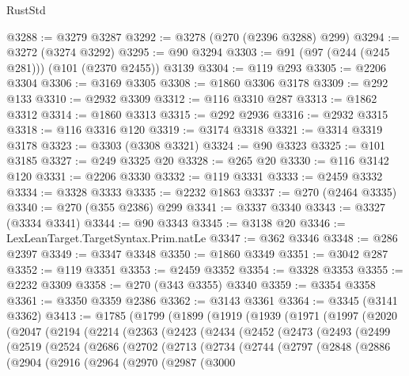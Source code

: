 \begin{lexlean}{RustStd}
\begin{coremodule}
@3288 := @3279 @3287
@3292 := @3278 (@270 (@2396 @3288) @299)
@3294 := @3272 (@3274 @3292)
@3295 := @90 @3294
@3303 := @91 (@97 (@244 (@245 @281))) (@101 (@2370 @2455)) @3139
@3304 := @119 @293
@3305 := @2206 @3304
@3306 := @3169 @3305
@3308 := @1860 @3306 @3178
@3309 := @292 @133
@3310 := @2932 @3309
@3312 := @116 @3310 @287
@3313 := @1862 @3312
@3314 := @1860 @3313
@3315 := @292 @2936
@3316 := @2932 @3315
@3318 := @116 @3316 @120
@3319 := @3174 @3318
@3321 := @3314 @3319 @3178
@3323 := @3303 (@3308 @3321)
@3324 := @90 @3323
@3325 := @101 @3185
@3327 := @249 @3325 @20
@3328 := @265 @20
@3330 := @116 @3142 @120
@3331 := @2206 @3330
@3332 := @119 @3331
@3333 := @2459 @3332
@3334 := @3328 @3333
@3335 := @2232 @1863
@3337 := @270 (@2464 @3335)
@3340 := @270 (@355 @2386) @299
@3341 := @3337 @3340
@3343 := @3327 (@3334 @3341)
@3344 := @90 @3343
@3345 := @3138 @20
@3346 := LexLeanTarget.TargetSyntax.Prim.natLe
@3347 := @362 @3346
@3348 := @286 @2397
@3349 := @3347 @3348
@3350 := @1860 @3349
@3351 := @3042 @287
@3352 := @119 @3351
@3353 := @2459 @3352
@3354 := @3328 @3353
@3355 := @2232 @3309
@3358 := @270 (@343 @3355) @3340
@3359 := @3354 @3358
@3361 := @3350 @3359 @2386
@3362 := @3143 @3361
@3364 := @3345 (@3141 @3362)
@3413 := @1785
    (@1799
      (@1899
        (@1919
          (@1939
            (@1971
              (@1997
                (@2020
                  (@2047
                    (@2194
                      (@2214
                        (@2363
                          (@2423
                            (@2434
                              (@2452
                                (@2473
                                  (@2493
                                    (@2499
                                      (@2519
                                        (@2524
                                          (@2686
                                            (@2702
                                              (@2713
                                                (@2734
                                                  (@2744
                                                    (@2797
                                                      (@2848
                                                        (@2886
                                                          (@2904
                                                            (@2916
                                                              (@2964
                                                                (@2970
                                                                  (@2987
                                                                    (@3000

\end{coremodule}
\end{lexlean}
